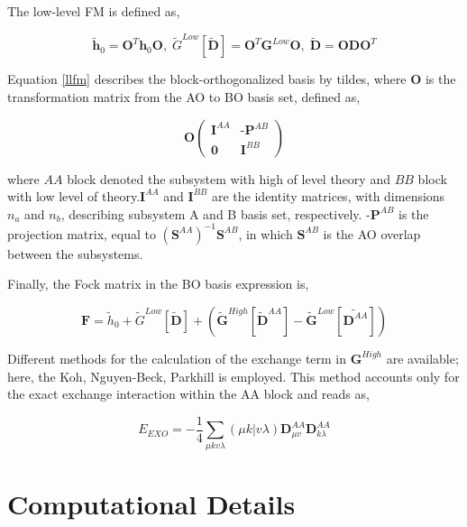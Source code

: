 \documentclass[notitlepage,12pt]{report}
\begin{document}
The low-level FM is defined as,

\begin{equation}
	\label{llfm}
	\tilde{\textbf{h}}_0 = \textbf{O}^{T}\textbf{h}_0\textbf{O}, \;  \tilde{G}^{Low}[\tilde{\textbf{D}}]= \textbf{O}^{T}\textbf{G}^{Low}\textbf{O}, \;  \tilde{\textbf{D}} = \textbf{O} \textbf{D} \textbf{O}^{T}
\end{equation} 

Equation \ref{llfm} describes the block-orthogonalized basis by tildes, where $\textbf{O}$ is the transformation matrix from the AO to BO basis set, defined as,

\begin{equation}
	\textbf{O}
	\begin{pmatrix}
		\textbf{I}^{AA} & \textbf{-P}^{AB} \\
		\textbf{0} & \textbf{I}^{BB}  
	\end{pmatrix}
\end{equation}

where $AA$ block denoted the subsystem with high of level theory and $BB$ block with low level of theory.$\textbf{I}^{AA}$ and $\textbf{I}^{BB}$ are the identity matrices, with dimensions $n_a$ and $n_b$, describing subsystem A and B basis set, respectively.  $\textbf{-P}^{AB}$ is the projection matrix, equal to $(\textbf{S}^{AA})^{-1}\textbf{S}^{AB}$, in which $\textbf{S}^{AB}$ is the AO overlap between the subsystems. 

Finally, the Fock matrix in the BO basis expression is,

\begin{equation}
	\textbf{F} = \tilde{h}_0 + \tilde{G}^{Low}[\tilde{\textbf{D}}] +(\tilde{\textbf{G}}^{High}[\tilde{\textbf{D}}^{AA}]-\tilde{\textbf{G}}^{Low}[\tilde{\textbf{D}^{AA}}])
\end{equation}

Different methods for the calculation of the exchange term in $\textbf{G}^{High}$ are available; here, the Koh, Nguyen-Beck, Parkhill is employed. This method accounts only for the exact exchange interaction within the AA block and reads as,

\begin{equation}
	E_{EXO}=-\frac{1}{4} \sum_{\mu kv\lambda} (\mu k|v\lambda) \textbf{D}_{\mu v}^{AA} \textbf{D}_{k \lambda}^{AA}
\end{equation}

\section{Computational Details}
\end{document}
